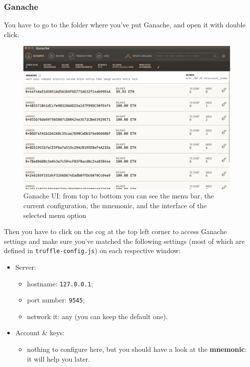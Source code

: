 \subsubsection{Ganache}
You have to go to the folder where you've put Ganache, and open it with double click.
\begin{figure}
	\centering
	\includegraphics[scale=0.25]{res/images/ganache-ui.png}
	\caption{Ganache UI: from top to bottom you can see the menu bar, the current configuration, the mnemonic, and the interface of the selected menu option}
\end{figure}
Then you have to click on the cog at the top left corner to access Ganache settings and make sure you've matched the following settings (most of which are defined in \texttt{truffle-config.js}) on each respective window:
\begin{itemize}
	\item Server:
	\begin{itemize}
		\item hostname: \texttt{127.0.0.1};
		\item port number: \texttt{9545};
		\item network it: any (you can keep the default one).
	\end{itemize}
	\item Account \& keys:
	\begin{itemize}
		\item nothing to configure here, but you should have a look at the \textbf{mnemonic}: it will help you later.
	\end{itemize}
\end{itemize}

